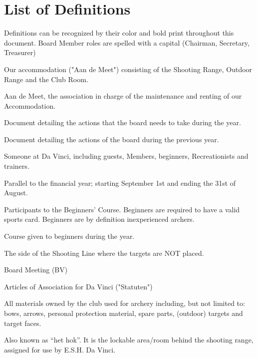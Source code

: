 \documentclass[a4paper]{article}
\newcommand{\Abr}{Administrative Regulations} %
\newcommand{\Asta}{Bylaws} %
\newcommand{\Ajv}{Annual Report} %
\begin{document}
\newpage

\tableofcontents
\pagebreak
\section*{List of Definitions}
{\g Definitions can be recognized by their color and bold print throughout this document. Board Member roles are spelled with a capital (Chairman, Secretary, Treasurer)}

\bigskip

\begin{description}[font=\sffamily\bfseries, leftmargin=1cm, style=nextline]
\item[{\defi Accommodation}] Our accommodation ("Aan de Meet") consisting of the Shooting Range, Outdoor Range and the { Club Room}.
    \item[{\defi ADM}]
    Aan de Meet, the association in charge of the maintenance and renting of our { Accommodation}.
\item[{\defi \Abr}] Document detailing the actions that the board needs to take during the year.
\item[{\defi \Ajv}] Document detailing the actions of the board during the previous year.
\item[\defi Archer] Someone at Da Vinci, including { guests}, { Members}, { beginners}, { Recreationists} and trainers.
    \item[{\defi Association Year}]
    Parallel to the financial year; starting September 1st and ending the 31st of August. 
\item[{\defi Beginner}]
Participants to the { Beginners' Course}. Beginners are required to have a valid sports card. Beginners are by definition { inexperienced} archers.
\item[{\defi Beginners' Course}] Course given to beginners during the year.
    \item[{\defi “Behind the line”}]
    The side of the Shooting Line where the targets are NOT placed. 
  \item[{\defi BM}]
    Board Meeting (BV)
\item[{\defi \Asta}] Articles of Association for Da Vinci ("Statuten")
\item[\defi Club Materials] All materials owned by the club used for archery including, but not limited to: bows, arrows, personal protection material, spare parts, (outdoor) targets and target faces.
\item[{\defi Club Room}] Also known as “het hok”. It is the lockable area/room behind the shooting range, assigned for use by E.S.H. Da Vinci.

\end{description}
\end{document}
